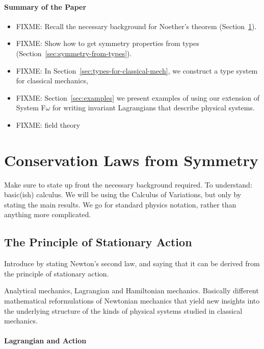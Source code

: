 \documentclass[preprint]{sigplanconf}
\theoremstyle{examplestyle}
\begin{document}
\paragraph{Summary of the Paper}

\begin{itemize}
\item FIXME: Recall the necessary background for Noether's theorem
  (Section~\ref{sec:conservation-laws-from-symmetry}).
\item FIXME: Show how to get symmetry properties from types
  (Section~\ref{sec:symmetry-from-types}).
\item FIXME: In Section~\ref{sec:types-for-classical-mech}, we
  construct a type system for classical mechanics,
\item FIXME: Section~\ref{sec:examples} we present examples of using
  our extension of System F$\omega$ for writing invariant Lagrangians
  that describe physical systems.
\item FIXME: field theory
\end{itemize}

\section{Conservation Laws from Symmetry}
\label{sec:conservation-laws-from-symmetry}

Make sure to state up front the necessary background required. To
understand: basic(ish) calculus. We will be using the Calculus of
Variations, but only by stating the main results. We go for standard
physics notation, rather than anything more complicated.

\subsection{The Principle of Stationary Action}

Introduce by stating Newton's second law, and saying that it can be
derived from the principle of stationary action.

Analytical mechanics, Lagrangian and Hamiltonian mechanics. Basically
different mathematical reformulations of Newtonian mechanics that
yield new insights into the underlying structure of the kinds of
physical systems studied in classical mechanics. 

\paragraph{Lagrangian and Action}
\end{document}
